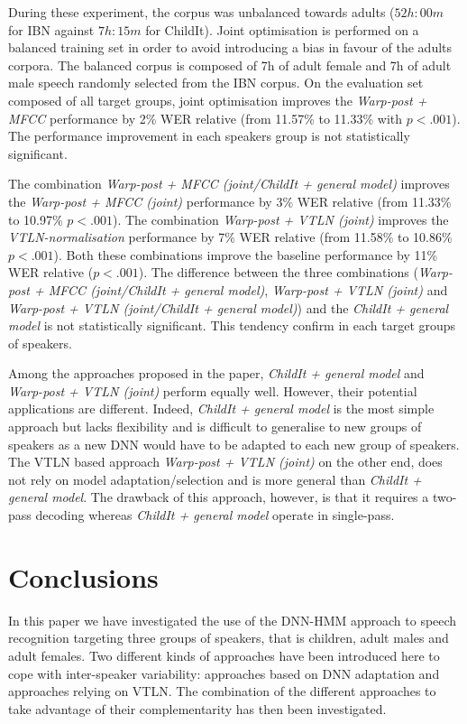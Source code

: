 \documentclass{nle}
\begin{document}
During these experiment, the corpus was unbalanced towards adults ($52h:00m$ for IBN against $7h:15m$ for ChildIt). Joint optimisation is performed on a balanced training set in order to avoid introducing a bias in favour of the adults corpora. The balanced corpus is composed of 7h of adult female and 7h of adult male speech randomly selected from the IBN corpus. On the evaluation set composed of all target groups, joint optimisation improves the {\em Warp-post + MFCC} performance by 2\% WER relative (from 11.57\% to 11.33\% with $p<.001$). The performance improvement in each speakers group is not statistically significant.

The combination {\em Warp-post + MFCC (joint/ChildIt + general model)} improves the {\em Warp-post + MFCC (joint)} performance by 3\% WER relative (from 11.33\% to 10.97\% $p<.001$). The combination {\em Warp-post + VTLN (joint)} improves the {\em VTLN-normalisation} performance by 7\% WER relative (from 11.58\% to 10.86\% $p<.001$). Both these combinations improve the baseline performance by 11\% WER relative ($p<.001$). The difference between the three combinations ({\em Warp-post + MFCC (joint/ChildIt + general model)}, {\em Warp-post + VTLN (joint)} and {\em Warp-post + VTLN (joint/ChildIt + general model)}) and the {\em ChildIt + general model} is not statistically significant. This tendency confirm in each target groups of speakers.

Among the approaches proposed in the paper, {\em ChildIt + general model} and {\em Warp-post + VTLN (joint)} perform equally well. However, their potential applications are different. Indeed, {\em ChildIt + general model} is the most simple approach but lacks flexibility and is difficult to generalise to new groups of speakers as a new DNN would have to be adapted to each new group of speakers. The VTLN based approach {\em Warp-post + VTLN (joint)} on the other end, does not rely on model adaptation/selection and is more general than {\em ChildIt + general model}. The drawback of this approach, however, is that it requires a two-pass decoding whereas {\em ChildIt + general model} operate in single-pass.


\section{Conclusions}\label{section:concl}
In this paper we have investigated  the use of the DNN-HMM approach to
speech  recognition  targeting  three  groups  of  speakers,  that  is
children,  adult  males and  adult  females.  Two  different kinds  of
approaches   have   been  introduced   here   to  cope  with  inter-speaker
variability: approaches based on DNN adaptation and approaches relying
on VTLN. The combination of the different approaches to take advantage
of their complementarity has then been investigated.
\end{document}

